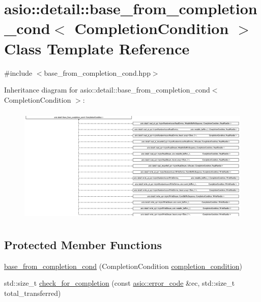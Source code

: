 \hypertarget{classasio_1_1detail_1_1base__from__completion__cond}{}\section{asio\+:\+:detail\+:\+:base\+\_\+from\+\_\+completion\+\_\+cond$<$ Completion\+Condition $>$ Class Template Reference}
\label{classasio_1_1detail_1_1base__from__completion__cond}


{\ttfamily \#include $<$base\+\_\+from\+\_\+completion\+\_\+cond.\+hpp$>$}

Inheritance diagram for asio\+:\+:detail\+:\+:base\+\_\+from\+\_\+completion\+\_\+cond$<$ Completion\+Condition $>$\+:\begin{figure}[H]
\begin{center}
\leavevmode
\includegraphics[height=5.626477cm]{classasio_1_1detail_1_1base__from__completion__cond}
\end{center}
\end{figure}
\subsection*{Protected Member Functions}
\begin{DoxyCompactItemize}
\item 
\hyperlink{classasio_1_1detail_1_1base__from__completion__cond_ac07a2476dddb8b98f2852553e32c9d75}{base\+\_\+from\+\_\+completion\+\_\+cond} (Completion\+Condition \hyperlink{group__async__read_gae2e215d5013596cc2b385bb6c13fa518}{completion\+\_\+condition})
\item 
std\+::size\+\_\+t \hyperlink{classasio_1_1detail_1_1base__from__completion__cond_ac1e557edd956367409f816cbca2c76f0}{check\+\_\+for\+\_\+completion} (const \hyperlink{classasio_1_1error__code}{asio\+::error\+\_\+code} \&ec, std\+::size\+\_\+t total\+\_\+transferred)
\end{DoxyCompactItemize}


